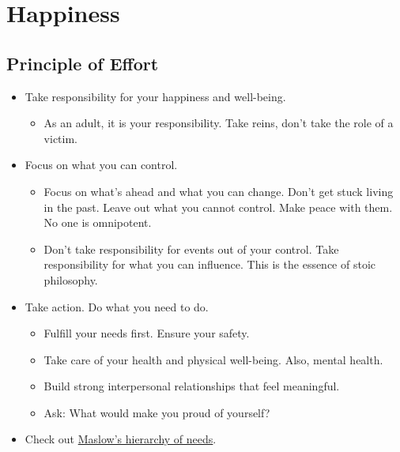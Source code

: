 \documentclass[
]{book}
\providecommand{\tightlist}{%
  \setlength{\itemsep}{0pt}\setlength{\parskip}{0pt}}
\begin{document}
\hypertarget{happiness}{%
\chapter{Happiness}\label{happiness}}

\hypertarget{principle-of-effort}{%
\section{Principle of Effort}\label{principle-of-effort}}

\begin{itemize}
\tightlist
\item
  Take responsibility for your happiness and well-being.

  \begin{itemize}
  \tightlist
  \item
    As an adult, it is your responsibility. Take reins, don't take the role of a victim.\\
  \end{itemize}
\item
  Focus on what you can control.

  \begin{itemize}
  \tightlist
  \item
    Focus on what's ahead and what you can change. Don't get stuck living in the past. Leave out what you cannot control. Make peace with them. No one is omnipotent.
  \item
    Don't take responsibility for events out of your control. Take responsibility for what you can influence. This is the essence of stoic philosophy.
  \end{itemize}
\item
  Take action. Do what you need to do.

  \begin{itemize}
  \tightlist
  \item
    Fulfill your needs first. Ensure your safety.
  \item
    Take care of your health and physical well-being. Also, mental health.
  \item
    Build strong interpersonal relationships that feel meaningful.
  \item
    Ask: What would make you proud of yourself?
  \end{itemize}
\item
  Check out \href{https://en.wikipedia.org/wiki/Maslow\textquotesingle{}s_hierarchy_of_needs}{Maslow's hierarchy of needs}.


\end{itemize}
\end{document}
